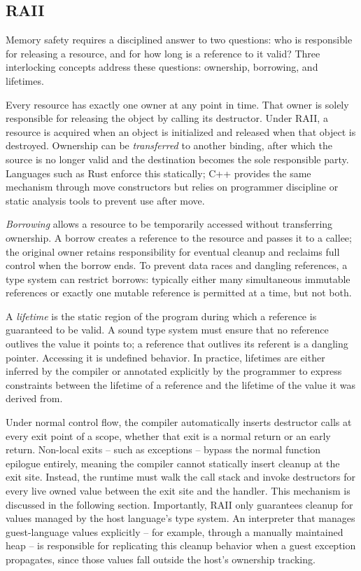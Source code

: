 \subsection{\acf{RAII}}

Memory safety requires a disciplined answer to two questions: who is responsible for releasing a resource, and for how long is a reference to it valid? Three interlocking concepts address these questions: ownership, borrowing, and lifetimes.

Every resource has exactly one owner at any point in time. That owner is solely responsible for releasing the object by calling its destructor. Under \ac{RAII}, a resource is acquired when an object is initialized and released when that object is destroyed. Ownership can be \emph{transferred} to another binding, after which the source is no longer valid and the destination becomes the sole responsible party. Languages such as Rust enforce this statically; C++ provides the same mechanism through move constructors but relies on programmer discipline or static analysis tools to prevent use after move.

\emph{Borrowing} allows a resource to be temporarily accessed without transferring ownership. A borrow creates a reference to the resource and passes it to a callee; the original owner retains responsibility for eventual cleanup and reclaims full control when the borrow ends. To prevent data races and dangling references, a type system can restrict borrows: typically either many simultaneous immutable references or exactly one mutable reference is permitted at a time, but not both.

A \emph{lifetime} is the static region of the program during which a reference is guaranteed to be valid. A sound type system must ensure that no reference outlives the value it points to; a reference that outlives its referent is a dangling pointer. Accessing it is undefined behavior. In practice, lifetimes are either inferred by the compiler or annotated explicitly by the programmer to express constraints between the lifetime of a reference and the lifetime of the value it was derived from\cite{jung2017rustbelt,stroustrup2015resource}.

Under normal control flow, the compiler automatically inserts destructor calls at every exit point of a scope, whether that exit is a normal return or an early return. Non-local exits -- such as exceptions -- bypass the normal function epilogue entirely, meaning the compiler cannot statically insert cleanup at the exit site. Instead, the runtime must walk the call stack and invoke destructors for every live owned value between the exit site and the handler. This mechanism is discussed in the following section. Importantly, \ac{RAII} only guarantees cleanup for values managed by the host language's type system. An interpreter that manages guest-language values explicitly -- for example, through a manually maintained heap -- is responsible for replicating this cleanup behavior when a guest exception propagates, since those values fall outside the host's ownership tracking.

